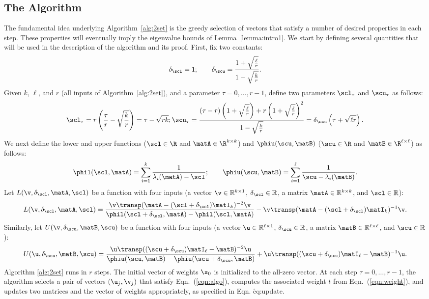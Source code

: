 \subsection{The Algorithm}
The fundamental idea underlying Algorithm~\ref{alg:2set} is the greedy selection of vectors that satisfy a number of desired properties in each step. These properties will eventually imply the eigenvalue bounds of Lemma~\ref{lemma:intro1}. We start by defining several quantities that will be used in the description of the algorithm and its proof. First, fix two constants:
$$
\delta_\scl = 1;
\qquad
\delta_\scu = \frac{1+\sqrt{\frac{\ell}{r}}}{1-\sqrt{\frac{k}{r}}}.
$$
Given $k$, $\ell$, and $r$ (all inputs of Algorithm~\ref{alg:2set}), and a parameter $\tau = 0,\ldots,r-1$, define two
parameters $\scl_\tau$ and $\scu_\tau$ as follows:
\begin{equation}\label{eqn:PD1}
\scl_\tau = r\left(\frac{\tau}{r}-\sqrt{\frac{k}{r}}\right) = \tau - \sqrt{rk};\\
\scu_\tau = \frac{(\tau-r)\left(1+\sqrt{\frac{\ell}{r}}\right)
               +r\left(1+\sqrt{\frac{\ell}{r}}\right)^2}
               {1-\sqrt{\frac{k}{r}}}=\delta_{\scu}\left(\tau + \sqrt{\ell r}\right).
\end{equation}
We next define the lower and upper
functions \math{\phil(\scl,\matA)} ($\scl\in\R$ and $\matA\in\R^{k \times k}$) and
$\phiu(\scu,\matB)$ ($\scu\in\R$ and $\matB\in\R^{\ell \times \ell}$) as follows:
\begin{equation}\label{eqn:PD2}
\phil(\scl, \matA) =  \sum_{i=1}^k\frac{1}{\lambda_i(\matA)-\scl};
\qquad
\phiu(\scu, \matB) =  \sum_{i=1}^\ell\frac{1}{\scu-\lambda_i(\matB)}.
\end{equation}
Let $L(\v, \delta_\scl, \matA, \scl)$  be a function with four inputs (a vector $\v \in \mathbb{R}^{k\times 1}$, $\delta_\scl \in \mathbb{R}$, a matrix $\matA \in \mathbb{R}^{k \times k}$, and $\scl \in \mathbb{R}$):
\begin{equation}\label{eqn:PD3}
L(\v, \delta_\scl, \matA, \scl)  =  \frac{\v\transp(\matA-(\scl + \delta_\scl)\matI_k)^{-2}\v}
{\phil(\scl + \delta_\scl, \matA)-\phil(\scl,\matA)} -\v\transp(\matA-(\scl + \delta_\scl)\matI_k)^{-1}\v.
\end{equation}
Similarly, let $U(\v, \delta_\scu, \matB, \scu)$  be a function with four inputs (a vector $\u \in \mathbb{R}^{\ell\times 1}$, $\delta_\scu \in \mathbb{R}$, a matrix $\matB \in \mathbb{R}^{\ell \times \ell}$, and $\scu \in \mathbb{R}$):
\begin{equation}\label{eqn:PD4}
U(\u, \delta_\scu, \matB, \scu )  = \frac{\u\transp((\scu + \delta_\scu)\matI_\ell-\matB)^{-2}\u}
{\phiu(\scu, \matB)-\phiu(\scu + \delta_\scu,\matB)}
+\u\transp((\scu + \delta_\scu)\matI_\ell-\matB)^{-1}\u.
\end{equation}
Algorithm \ref{alg:2set} runs in $r$ steps. The initial vector of weights $\s_0$ is initialized to the all-zero vector. At each step $\tau=0,\ldots,r-1$, the
algorithm selects a pair of vectors $(\u_j, \v_j)$ that satisfy Eqn.~(\ref{eqn:algo}), computes the associated weight $t$ from Eqn.~(\ref{eqn:weight}), and updates two matrices and the vector of weights appropriately, as specified
in Eqn. \r{eq:update}.


